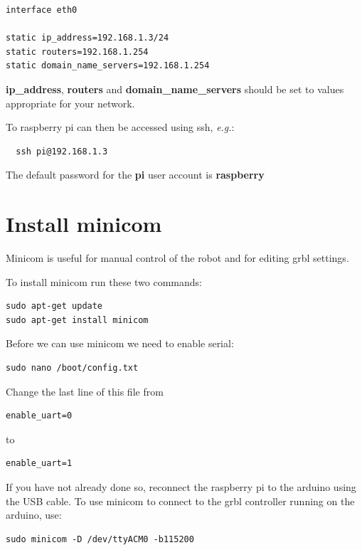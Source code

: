 \documentclass[]{book}
\theoremstyle{definition}
\theoremstyle{definition}
\theoremstyle{remark}
\begin{document}
\begin{verbatim}
interface eth0

static ip_address=192.168.1.3/24
static routers=192.168.1.254
static domain_name_servers=192.168.1.254
\end{verbatim}

\textbf{ip\_address}, \textbf{routers} and
\textbf{domain\_name\_servers} should be set to values appropriate for
your network.

To raspberry pi can then be accessed using ssh, \emph{e.g.}:

\begin{verbatim}
  ssh pi@192.168.1.3
\end{verbatim}

The default password for the \textbf{pi} user account is
\textbf{raspberry}

\section{Install minicom}\label{install-minicom}

Minicom is useful for manual control of the robot and for editing grbl
settings.

To install minicom run these two commands:

\begin{verbatim}
sudo apt-get update
sudo apt-get install minicom
\end{verbatim}

Before we can use minicom we need to enable serial:

\begin{verbatim}
sudo nano /boot/config.txt
\end{verbatim}

Change the last line of this file from

\begin{verbatim}
enable_uart=0
\end{verbatim}

to

\begin{verbatim}
enable_uart=1
\end{verbatim}

If you have not already done so, reconnect the raspberry pi to the
arduino using the USB cable. To use minicom to connect to the grbl
controller running on the arduino, use:

\begin{verbatim}
sudo minicom -D /dev/ttyACM0 -b115200
\end{verbatim}
\end{document}
